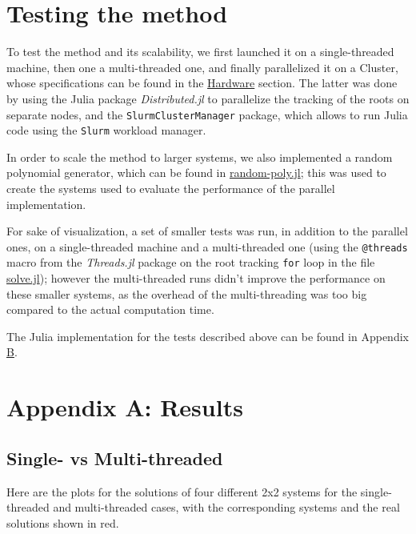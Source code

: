 \documentclass[a4paper]{article}
\theoremstyle{definition}
\theoremstyle{definition}
\theoremstyle{remark}
\theoremstyle{definition}
\begin{document}
\section{Testing the method}
To test the method and its scalability, we first launched it on a single-threaded machine, then one a multi-threaded one, and finally parallelized it on a Cluster, whose specifications can be found in the
\hyperref[sec:hw]{Hardware} section.
The latter was done by using the Julia package \textit{Distributed.jl} to parallelize the tracking of the roots on separate nodes, and the \texttt{SlurmClusterManager} package, which allows
to run Julia code using the \texttt{Slurm} workload manager.

In order to scale the method to larger systems, we also implemented a random polynomial generator, which can be found in \hyperref[sec:random]{random-poly.jl}; this was used to
create the systems used to evaluate the performance of the parallel implementation.

For sake of visualization, a set of smaller tests was run, in addition to the parallel ones, on a single-threaded machine and a multi-threaded one (using the \texttt{@threads}
macro from the \textit{Threads.jl} package on the root tracking \texttt{for} loop in the file \hyperref[sec:listing]{solve.jl}); however the multi-threaded runs didn't improve the
performance on these smaller systems, as the overhead of the multi-threading was too big compared to the actual computation time.


The Julia implementation for the tests described above can be found in Appendix \hyperref[sec:listing]{B}.

\section{Appendix A: Results}\label{sec:results}

\subsection{Single- vs Multi-threaded}

Here are the plots for the solutions of four different 2x2 systems for the single-threaded and multi-threaded cases, with the corresponding systems and the real solutions shown in
red.
\end{document}
